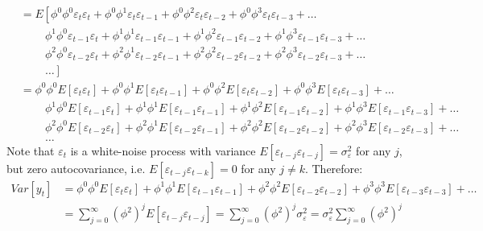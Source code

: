 \begin{enumerate}
\begin{itemize}
\begin{align*}
      &= E\left[ \phi^0 \phi^0 \varepsilon_{t} \varepsilon_{t} + \phi^0 \phi^1 \varepsilon_{t} \varepsilon_{t-1} + \phi^0 \phi^2 \varepsilon_{t} \varepsilon_{t-2} + \phi^0 \phi^3 \varepsilon_{t} \varepsilon_{t-3} + \ldots \right.
      \\
      & \qquad~\phi^1 \phi^0 \varepsilon_{t-1} \varepsilon_{t} + \phi^1 \phi^1 \varepsilon_{t-1} \varepsilon_{t-1} + \phi^1 \phi^2 \varepsilon_{t-1} \varepsilon_{t-2} + \phi^1 \phi^3 \varepsilon_{t-1} \varepsilon_{t-3} + \ldots
      \\
      & \qquad~\phi^2 \phi^0 \varepsilon_{t-2} \varepsilon_{t} + \phi^2 \phi^1 \varepsilon_{t-2} \varepsilon_{t-1} + \phi^2 \phi^2 \varepsilon_{t-2} \varepsilon_{t-2} + \phi^2 \phi^3 \varepsilon_{t-2} \varepsilon_{t-3} + \ldots
      \\&\left.\qquad~\ldots\right]
      \\
      &= \phi^0 \phi^0 E[\varepsilon_{t} \varepsilon_{t}] + \phi^0 \phi^1 E[\varepsilon_{t} \varepsilon_{t-1}] + \phi^0 \phi^2 E[\varepsilon_{t} \varepsilon_{t-2}] + \phi^0 \phi^3 E[\varepsilon_{t} \varepsilon_{t-3}] + \ldots
      \\
      & \qquad~\phi^1 \phi^0 E[\varepsilon_{t-1} \varepsilon_{t}] + \phi^1 \phi^1 E[\varepsilon_{t-1} \varepsilon_{t-1}] + \phi^1 \phi^2 E[\varepsilon_{t-1} \varepsilon_{t-2}] + \phi^1 \phi^3 E[\varepsilon_{t-1} \varepsilon_{t-3}] + \ldots
      \\
      & \qquad~\phi^2 \phi^0 E[\varepsilon_{t-2} \varepsilon_{t}] + \phi^2 \phi^1 E[\varepsilon_{t-2} \varepsilon_{t-1}] + \phi^2 \phi^2 E[\varepsilon_{t-2} \varepsilon_{t-2}] + \phi^2 \phi^3 E[\varepsilon_{t-2} \varepsilon_{t-3}] + \ldots
      \\&\qquad~\ldots
      \end{align*}
      Note that \(\varepsilon_t\) is a white-noise process with variance \(E[\varepsilon_{t-j} \varepsilon_{t-j}]=\sigma_\varepsilon^2\) for any \(j\),
      but zero autocovariance, i.e. \(E[\varepsilon_{t-j} \varepsilon_{t-k}]=0\) for any \(j \neq k\).
      Therefore:
      \begin{align*}
      Var[y_t] &= \phi^0 \phi^0 E[\varepsilon_{t} \varepsilon_{t}] + \phi^1 \phi^1 E[\varepsilon_{t-1} \varepsilon_{t-1}] + \phi^2 \phi^2 E[\varepsilon_{t-2} \varepsilon_{t-2}] + \phi^3 \phi^3 E[\varepsilon_{t-3} \varepsilon_{t-3}] + \ldots
      \\
      &= \sum_{j=0}^\infty (\phi^{2})^j E[\varepsilon_{t-j} \varepsilon_{t-j}]
      = \sum_{j=0}^\infty (\phi^{2})^j \sigma_\varepsilon^2
      = \sigma_\varepsilon^2 \sum_{j=0}^\infty (\phi^{2})^j

\end{align*}
\end{itemize}
\end{enumerate}
